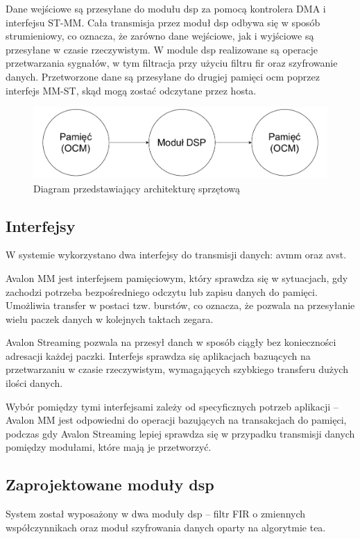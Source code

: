 Dane wejściowe są przesyłane do modułu \ac{dsp} za pomocą kontrolera DMA i interfejsu ST-MM. Cała transmisja przez moduł \ac{dsp} odbywa się w sposób strumieniowy, co oznacza, że zarówno dane wejściowe, jak i wyjściowe są przesyłane w czasie rzeczywistym. W module \ac{dsp} realizowane są operacje przetwarzania sygnałów, w tym filtracja przy użyciu filtru \ac{fir} oraz szyfrowanie danych. Przetworzone dane są przesyłane do drugiej pamięci \ac{ocm} poprzez interfejs MM-ST, skąd mogą zostać odczytane przez hosta.

\begin{figure}[!htb]
    \centerline{\includegraphics[scale=0.5]{uproszczonySchematHW.pdf}}
    \caption{Diagram przedstawiający architekturę sprzętową}
    \label{fig:uproszczony-schemat-hw}
\end{figure}

\subsection{Interfejsy}
W systemie wykorzystano dwa interfejsy do transmisji danych: \ac{avmm} oraz \ac{avst}.

Avalon MM jest interfejsem pamięciowym, który sprawdza się w sytuacjach, gdy zachodzi potrzeba bezpośredniego odczytu lub zapisu danych do pamięci. Umożliwia transfer w postaci tzw. burstów, co oznacza, że pozwala na przesyłanie wielu paczek danych w kolejnych taktach zegara.

Avalon Streaming pozwala na przesył danch w sposób ciągły bez konieczności adresacji każdej paczki. Interfejs sprawdza się aplikacjach bazuących na przetwarzaniu w czasie rzeczywistym, wymagających szybkiego transferu dużych ilości danych.

Wybór pomiędzy tymi interfejsami zależy od specyficznych potrzeb aplikacji -- Avalon MM jest odpowiedni do operacji bazujących na transakcjach do pamięci, podczas gdy Avalon Streaming lepiej sprawdza się w przypadku transmisji danych pomiędzy modułami, które mają je przetworzyć.

\subsection{Zaprojektowane moduły \ac{dsp}}
System został wyposażony w dwa moduły \ac{dsp} -- filtr FIR o zmiennych współczynnikach oraz moduł szyfrowania danych oparty na algorytmie \ac{tea}.

